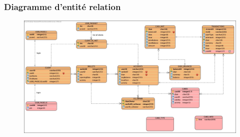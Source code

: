 \documentclass[../rapport.tex]{subfiles}
\begin{document}
\subsubsection{Diagramme d'entité relation}
	\begin{figure}[h!]
		\centering\includegraphics[scale=0.15]{ressources/photos_diagrammes/extensionTheo/erdTheo.jpg}
	\end{figure}

\newpage
\end{document}
